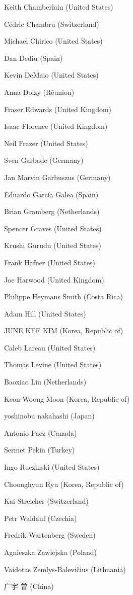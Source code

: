 Keith Chamberlain (United States)

Cédric Chambru (Switzerland)

Michael Chirico (United States)

Dan Dediu (Spain)

Kevin DeMaio (United States)

Anna Doizy (Réunion)

Fraser Edwards (United Kingdom)

Isaac Florence (United Kingdom)

Neil Frazer (United States)

Sven Garbade (Germany)

Jan Marvin Garbuszus (Germany)

Eduardo García Galea (Spain)

Brian Gramberg (Netherlands)

Spencer Graves (United States)

Krushi Gurudu (United States)

Frank Hafner (United States)

Joe Harwood (United Kingdom)

Philippe Heymans Smith (Costa Rica)

Adam Hill (United States)

JUNE KEE KIM (Korea, Republic of)

Caleb Lareau (United States)

Thomas Levine (United States)

Baoxiao Liu (Netherlands)

Keon-Woong Moon (Korea, Republic of)

yoshinobu nakahashi (Japan)

Antonio Paez (Canada)

Sermet Pekin (Turkey)

Ingo Ruczinski (United States)

Choonghyun Ryu (Korea, Republic of)

Kai Streicher (Switzerland)

Petr Waldauf (Czechia)

Fredrik Wartenberg (Sweden)

Agnieszka Zawiejska (Poland)

Vaidotas Zemlys-Balevičius (Lithuania)

广宇 曾 (China)


\address{%
Torsten Hothorn\\
Universität Zürich\\%
Switzerland\\
%
%
\textit{ORCiD: \href{https://orcid.org/0000-0001-8301-0471}{0000-0001-8301-0471}}\\%
\href{mailto:Torsten.Hothorn@R-project.org}{\nolinkurl{Torsten.Hothorn@R-project.org}}%
}
